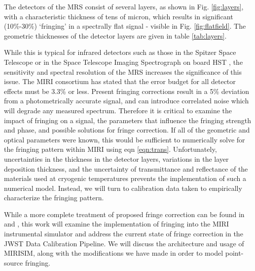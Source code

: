 The detectors of the MRS consist of several layers, as shown in Fig. \ref{fig:layers}, with a characteristic thickness of tens of micron, which results in significant (10\%-30\%) `fringing' in a spectrally flat signal - visible in Fig. \ref{fig:flatfield}.
The geometric thicknesses of the detector layers are given in table \ref{tab:layers}.

While this is typical for infrared detectors such as those in the Spitzer Space Telescope \parencite{Lahuis2003} or in the Space Telescope Imaging Spectrograph on board HST \parencite{Malumuth2003}, the sensitivity and spectral resolution of the MRS increases the significance of this issue.
The MIRI consortium has stated that the error budget for all detector effects must be 3.3\% or less. 
Present fringing corrections result in a 5\% deviation from a photometrically accurate signal, and can introduce correlated noise which will degrade any measured spectrum.
Therefore it is critical to examine the impact of fringing on a signal, the parameters that influence the fringing strength and phase, and possible solutions for fringe correction. 
If all of the geometric and optical parameters were known, this would be sufficient to numerically solve for the fringing pattern within MIRI using eqn \ref{eqn:trans}. 
Unfortunately, uncertainties in the thickness in the detector layers, variations in the layer deposition thickness, and the uncertainty of transmittance and reflectance of the materials used at cryogenic temperatures prevents the implementation of such a numerical model.
Instead, we will turn to calibration data taken to empirically characterize the fringing pattern.

While a more complete treatment of proposed fringe correction can be found in \parencite{Argyriou2020} and \parencite{Lahuis2018}, this work will examine the implementation of fringing into the MIRI instrumental simulator and address the current state of fringe correction in the JWST Data Calibration Pipeline.
We will discuss the architecture and usage of MIRISIM, along with the modifications we have made in order to model point-source fringing.

